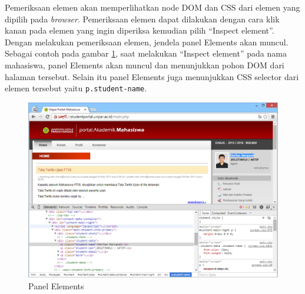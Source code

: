 Pemeriksaan elemen akan memperlihatkan node DOM dan CSS dari elemen yang dipilih pada \textit{browser}. Pemeriksaan elemen dapat dilakukan dengan cara klik kanan pada elemen yang ingin diperiksa kemudian pilih ``Inspect element''. Dengan melakukan pemeriksaan elemen, jendela panel Elements akan muncul. Sebagai contoh pada gambar \ref{fig:2_elements_panel}, saat melakukan ``Inspect element'' pada nama mahasiswa, panel Elements akan muncul dan menunjukkan pohon DOM dari halaman tersebut. Selain itu panel Elements juga menunjukkan CSS selector dari elemen tersebut yaitu \texttt{p.student-name}.

\begin{figure}[H]
	\centering
	\includegraphics[scale=0.5]{Gambar/elements-panel}
	\caption{Panel Elements} 
	\label{fig:2_elements_panel}
\end{figure}

